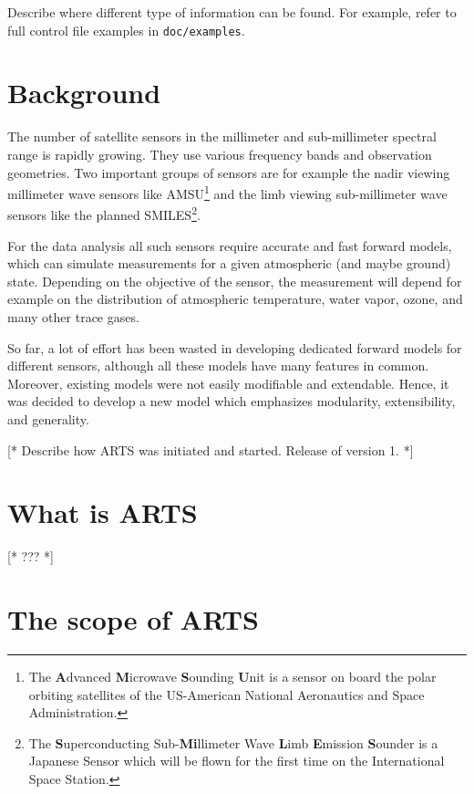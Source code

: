 Describe where different type of information can be found. For
example, refer to full control file examples in \verb|doc/examples|.





\section{Background}
\label{sec:intro:background}

The number of satellite sensors in the millimeter and sub-millimeter
spectral range is rapidly growing. They use various frequency
bands and observation geometries. Two important groups of
sensors are for example the nadir viewing millimeter wave
sensors like AMSU\footnote{The \textbf{A}dvanced
  \textbf{M}icrowave \textbf{S}ounding \textbf{U}nit is a
  sensor on board the polar orbiting satellites of the
  US-American National Aeronautics and Space Administration.}
and the limb viewing sub-millimeter wave sensors like the
planned SMILES\footnote{The \textbf{S}uperconducting
  Sub-\textbf{Mi}llimeter Wave \textbf{L}imb \textbf{E}mission
  \textbf{S}ounder is a Japanese Sensor which will be flown
  for the first time on the International Space Station.}.

For the data analysis all such sensors require accurate and
fast forward models, which can simulate measurements for a
given atmospheric (and maybe ground) state. Depending on the
objective of the sensor, the measurement will depend for
example on the distribution of atmospheric temperature, water
vapor, ozone, and many other trace gases.

So far, a lot of effort has been wasted in developing dedicated
forward models for different sensors, although all these models have
many features in common. Moreover, existing models were not easily
modifiable and extendable. Hence, it was decided to develop a new
model which emphasizes modularity, extensibility, and generality.

[* Describe how ARTS was initiated and started. Release of version 1. *]


\section{What is ARTS}
\label{sec:intro:whatis}

[* ??? *]


\section{The scope of ARTS}
\label{sec:intro:scope}

